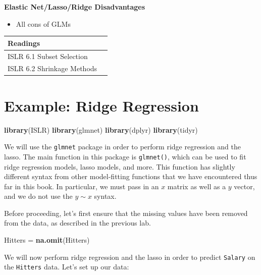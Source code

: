 \documentclass[openany]{book}
\newenvironment{Shaded}{\begin{snugshade}}{\end{snugshade}}
\newcommand{\CommentTok}[1]{\textcolor[rgb]{0.56,0.35,0.01}{\textit{#1}}}
\newcommand{\DecValTok}[1]{\textcolor[rgb]{0.00,0.00,0.81}{#1}}
\newcommand{\KeywordTok}[1]{\textcolor[rgb]{0.13,0.29,0.53}{\textbf{#1}}}
\newcommand{\NormalTok}[1]{#1}
\newcommand{\OperatorTok}[1]{\textcolor[rgb]{0.81,0.36,0.00}{\textbf{#1}}}
\newcommand{\StringTok}[1]{\textcolor[rgb]{0.31,0.60,0.02}{#1}}
\providecommand{\tightlist}{%
  \setlength{\itemsep}{0pt}\setlength{\parskip}{0pt}}
\begin{document}
\textbf{Elastic Net/Lasso/Ridge Disadvantages}

\begin{itemize}
\tightlist
\item
  All cons of GLMs
\end{itemize}

\begin{longtable}[]{@{}ll@{}}
\toprule
Readings &\tabularnewline
\midrule
\endhead
ISLR 6.1 Subset Selection &\tabularnewline
ISLR 6.2 Shrinkage Methods &\tabularnewline
\bottomrule
\end{longtable}

\hypertarget{example-ridge-regression}{%
\section{Example: Ridge Regression}\label{example-ridge-regression}}

\begin{Shaded}
\begin{Highlighting}[]
\KeywordTok{library}\NormalTok{(ISLR)}
\KeywordTok{library}\NormalTok{(glmnet)}
\KeywordTok{library}\NormalTok{(dplyr)}
\KeywordTok{library}\NormalTok{(tidyr)}
\end{Highlighting}
\end{Shaded}

We will use the \texttt{glmnet} package in order to perform ridge regression and
the lasso. The main function in this package is \texttt{glmnet()}, which can be used
to fit ridge regression models, lasso models, and more. This function has
slightly different syntax from other model-fitting functions that we have
encountered thus far in this book. In particular, we must pass in an \(x\)
matrix as well as a \(y\) vector, and we do not use the \(y \sim x\) syntax.

Before proceeding, let's first ensure that the missing values have
been removed from the data, as described in the previous lab.

\begin{Shaded}
\begin{Highlighting}[]
\NormalTok{Hitters =}\StringTok{ }\KeywordTok{na.omit}\NormalTok{(Hitters)}
\end{Highlighting}
\end{Shaded}

We will now perform ridge regression and the lasso in order to predict \texttt{Salary} on
the \texttt{Hitters} data. Let's set up our data:

\begin{Shaded}
\end{Shaded}
\end{document}
